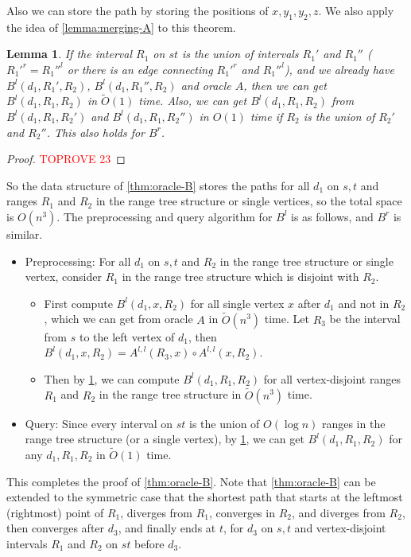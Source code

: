 \documentclass[11pt]{article}
\theoremstyle{plain}
\newtheorem{lemma}[theorem]{Lemma}
\theoremstyle{definition}
\newcommand{\too}[1]{\tilde{O}({#1})}
\newcommand{\zdd}[1]{{#1}^{l}}
\newcommand{\ydd}[1]{{#1}^{r}}
\begin{document}
Also we can store the path by storing the positions of $x,y_1,y_2,z$. We also apply the idea of \cref{lemma:merging-A} to this theorem.

\begin{lemma}\label{lemma:merging-B}
    If the interval $R_1$ on $st$ is the union of intervals $R_1'$ and $R_1''$ ($\ydd{R_1'}=\zdd{R_1''}$ or there is an edge connecting $\ydd{R_1'}$ and $\zdd{R_1''}$), and we already have $B^l(d_1,R_1',R_2)$, $B^l(d_1,R_1'',R_2)$ and oracle $A$, then we can get $B^l(d_1,R_1,R_2)$ in $\too{1}$ time. Also, we can get $B^l(d_1,R_1,R_2)$ from $B^l(d_1,R_1,R_2')$ and $B^l(d_1,R_1,R_2'')$ in $O(1)$ time if $R_2$ is the union of $R_2'$ and $R_2''$. This also holds for $B^r$.
\end{lemma}
\begin{proof}\textcolor{red}{TOPROVE 23}\end{proof}

So the data structure of \cref{thm:oracle-B} stores the paths for all $d_1$ on $s,t$ and ranges $R_1$ and $R_2$ in the range tree structure or single vertices, so the total space is $O(n^3)$. The preprocessing and query algorithm for $B^l$ is as follows, and $B^r$ is similar.
\begin{itemize}
    \item Preprocessing: For all $d_1$ on $s,t$ and $R_2$ in the range tree structure or single vertex, consider $R_1$ in the range tree structure which is disjoint with $R_2$.
    \begin{itemize}
        \item First compute $B^l(d_1,x,R_2)$ for all single vertex $x$ after $d_1$ and not in $R_2$, which we can get from oracle $A$ in $\too{n^3}$ time. Let $R_3$ be the interval from $s$ to the left vertex of $d_1$, then $B^l(d_1,x,R_2)=A^{l,l}(R_3,x)\circ A^{l,l}(x,R_2)$.
        \item Then by \cref{lemma:merging-B}, we can compute $B^l(d_1,R_1,R_2)$ for all vertex-disjoint ranges $R_1$ and $R_2$ in the range tree structure in $\too{n^3}$ time.
    \end{itemize}
    \item Query: Since every interval on $st$ is the union of $O(\log n)$ ranges in the range tree structure (or a single vertex), by \cref{lemma:merging-B}, we can get $B^l(d_1,R_1,R_2)$ for any $d_1,R_1,R_2$ in $\too{1}$ time.
\end{itemize}

This completes the proof of \cref{thm:oracle-B}. Note that \cref{thm:oracle-B} can be extended to the symmetric case that the shortest path that starts at the leftmost (rightmost) point of $R_1$, diverges from $R_1$, converges in $R_2$, and diverges from $R_2$, then converges after $d_3$, and finally ends at $t$, for $d_3$ on $s,t$ and vertex-disjoint intervals $R_1$ and $R_2$ on $st$ before $d_3$.
\end{document}
